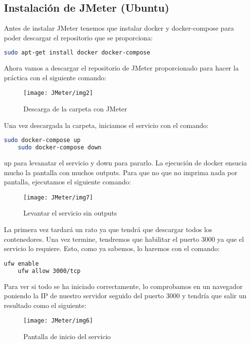 \subsection{Instalación de JMeter (Ubuntu)}

Antes de instalar JMeter tenemos que instalar docker y docker-compose para poder descargar el repositorio que se proporciona:

\begin{lstlisting}[language=bash]
    sudo apt-get install docker docker-compose
\end{lstlisting}

Ahora vamos a descargar el repositorio de JMeter proporcionado para hacer la práctica con el siguiente comando:

\begin{figure}[H]
    \centering
    \texttt{[image: JMeter/img2]}
    \caption{Descarga de la carpeta con JMeter}
\end{figure}

Una vez descargada la carpeta, iniciamos el servicio con el comando:

\begin{lstlisting}[language=bash]
    sudo docker-compose up
    sudo docker-compose down
\end{lstlisting}

up para levanatar el servicio y down para pararlo. La ejecución de docker ensucia mucho la pantalla con muchos outputs. Para que no 
que no imprima nada por pantalla, ejecutamos el siguiente comando:

\begin{figure}[H]
    \centering
    \texttt{[image: JMeter/img7]}
    \caption{Levantar el servicio sin outputs}
\end{figure}

La primera vez tardará un rato ya que tendrá que descargar todos los contenedores. Una vez termine, tendremos que habilitar el puerto 3000 ya que el servicio lo requiere.
Esto, como ya sabemos, lo haremos con el comando:

\begin{lstlisting}[language=bash]
    ufw enable
    ufw allow 3000/tcp    
\end{lstlisting}

Para ver si todo se ha iniciado correctamente, lo comprobamos en un navegador poniendo la IP de nuestro servidor seguido del puerto 3000 y tendría que salir un resultado como el siguiente:

\begin{figure}[H]
    \centering
    \texttt{[image: JMeter/img6]}
    \caption{Pantalla de inicio del servicio}
\end{figure}

